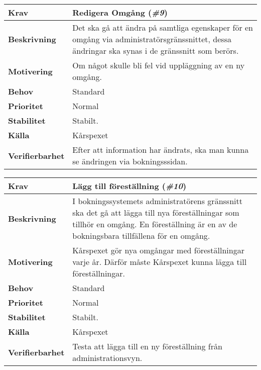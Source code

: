 \documentclass[a4paper, twoside, 11pt, titlepage]{article}
\begin{document}
	\begin{tabular} { p{2.6cm} p{12.5cm} }
		\hline
		\sffamily\textbf{Krav} & Redigera Omgång (\emph{\#9})  \\
		\hline
		\sffamily\textbf{Beskrivning} & Det ska gå att ändra på samtliga egenskaper för en omgång via administratörsgränssnittet, dessa ändringar ska synas i de gränssnitt som berörs.  \\
		\hline
		\sffamily\textbf{Motivering} & Om något skulle bli fel vid uppläggning av en ny omgång.  \\
		\hline
		\sffamily\textbf{Behov} & Standard  \\
		\hline
		\sffamily\textbf{Prioritet} & Normal  \\
		\hline
		\sffamily\textbf{Stabilitet} & Stabilt.  \\
		\hline
		\sffamily\textbf{Källa} & Kårspexet  \\
		\hline
		\sffamily\textbf{Verifierbarhet} & Efter att information har ändrats, ska man kunna se ändringen via bokningsssidan.  \\
		\hline
	\end{tabular}
	\vspace{6mm}

	\begin{tabular} { p{2.6cm} p{12.5cm} }
		\hline
		\sffamily\textbf{Krav} & Lägg till föreställning (\emph{\#10})  \\
		\hline
		\sffamily\textbf{Beskrivning} & I bokningssystemets administratörens gränssnitt ska det gå att lägga till nya föreställningar som tillhör en omgång. En föreställning är en av de bokningsbara tillfällena för en omgång.  \\
		\hline
		\sffamily\textbf{Motivering} & Kårspexet gör nya omgångar med föreställningar varje år. Därför måste Kårspexet kunna lägga till föreställningar.  \\
		\hline
		\sffamily\textbf{Behov} & Standard  \\
		\hline
		\sffamily\textbf{Prioritet} & Normal  \\
		\hline
		\sffamily\textbf{Stabilitet} & Stabilt.  \\
		\hline
		\sffamily\textbf{Källa} & Kårspexet  \\
		\hline
		\sffamily\textbf{Verifierbarhet} & Testa att lägga till en ny föreställning från administrationsvyn.  \\
		\hline
	\end{tabular}
	\vspace{6mm}
\end{document}
